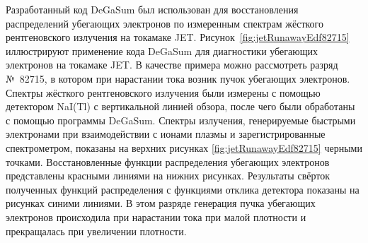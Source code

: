 Разработанный код DeGaSum был использован для восстановления распределений убегающих электронов по измеренным спектрам жёсткого рентгеновского излучения на токамаке JET. Рисунок~\ref{fig:jetRunawayEdf82715} иллюстрируют применение кода DeGaSum для диагностики убегающих электронов на токамаке JET. В качестве примера можно рассмотреть разряд №~82715, в котором при нарастании тока возник пучок убегающих электронов. Спектры жёсткого рентгеновского излучения были измерены с помощью   детектором NaI(Tl) с вертикальной линией обзора, после чего были обработаны с помощью программы DeGaSum. Спектры излучения, генерируемые быстрыми электронами при взаимодействии с ионами плазмы и зарегистрированные спектрометром, показаны на верхних рисунках \ref{fig:jetRunawayEdf82715} черными точками. Восстановленные функции распределения убегающих электронов представлены красными линиями на нижних рисунках. Результаты свёрток полученных функций распределения с функциями отклика детектора показаны на рисунках синими линиями. В этом разряде генерация пучка убегающих электронов происходила при нарастании тока при малой плотности и прекращалась при увеличении плотности.~\cite{Shevelev2013} 

%
%


